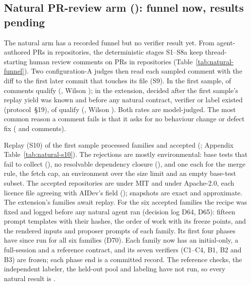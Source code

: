 \subsection{Natural PR-review arm (\texttt{\NATURALRUN}): funnel now, results pending}
\label{sec:results-natural}
The natural arm has a recorded funnel but no verifier result yet. From  agent-authored PRs in  repositories, the deterministic stages S1--S8a keep  thread-starting human review comments on  PRs in  repositories (Table~\ref{tab:natural-funnel}). Two configuration-A judges then read each sampled comment with the diff to the first later commit that touches its file (S9). In the first sample,  of  comments qualify (, Wilson ); in the extension, decided after the first sample's replay yield was known and before any natural contract, verifier or label existed (protocol~\S19),  of  qualify (, Wilson ). Both rates are model-judged. The most common reason a comment fails is that it asks for no behaviour change or defect fix ( and  comments).


Replay (S10) of the first sample processed  families and accepted  (; Appendix Table~\ref{tab:natural-s10}). The rejections are mostly environmental: base tests that fail to collect (), no resolvable dependency closure (), and one each for the merge rule, the fetch cap, an environment over the size limit and an empty base-test subset. The accepted repositories are  under MIT and  under Apache-2.0, each licence file agreeing with AIDev's field ();  snapshots are exact and  approximate. The extension's  families await replay. For the six accepted families the recipe was fixed and logged before any natural agent ran (decision log D64, D65): fifteen prompt templates with their hashes, the order of work with its freeze points, and the rendered inputs and proposer prompts of each family. Its first four phases have since run for all six families (D70). Each family now has an initial-only, a full-session and a reference contract, and its seven verifiers (C1--C4, B1, B2 and B3) are frozen; each phase end is a committed record. The reference checks, the independent labeler, the held-out pool and labeling have not run, so every natural result is .

